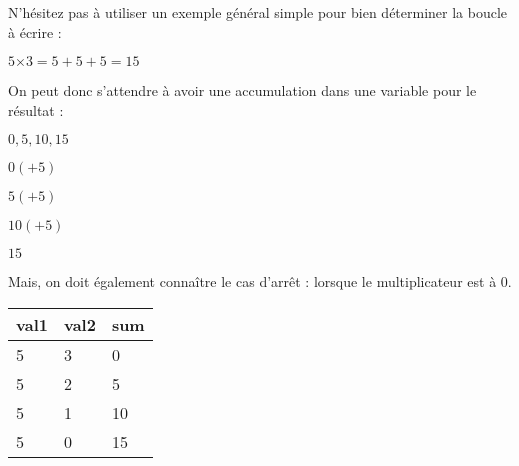 \documentclass[11pt,a4paper]{article}
\begin{document}
\bigskip

N'hésitez pas à utiliser un exemple général simple pour bien déterminer la boucle à écrire :
\begin{center}

$ 5 \text{×} 3 = 5 + 5 + 5 = 15 $

\end{center}

\bigskip

On peut donc s'attendre à avoir une accumulation dans une variable pour le résultat :
\begin{center}

$ 0, 5, 10, 15 $

\bigskip

$ 0 (+ 5) $

$ 5 (+ 5) $

$ 10 (+ 5) $

$ 15 $
\end{center}

\bigskip

Mais, on doit également connaître le cas d'arrêt : lorsque le multiplicateur est à $ 0 $.


\begin{center}
\begin{tabular}{|C{1cm}|C{1cm}|C{1cm}|}
 \hline
 val1 & val2 & sum \\
  & 3 &  0 \\
  5 & 2 &  5 \\
  5 & 1 & 10 \\
  5 & 0 & 15 \\
 \hline
\end{tabular}
\end{center}


\clearpage

\vfillFirst
\end{document}
